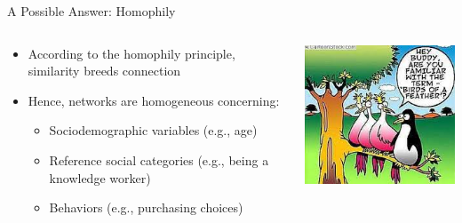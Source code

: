 \documentclass[notes, aspectratio=1610]{beamer}
\begin{document}
\begin{frame}{A Possible Answer: Homophily}{}
	\begin{columns}
		\begin{column}{0.5\textwidth}
		\begin{itemize}
			\item 
			According to the homophily principle, similarity breeds 
			connection
			\pause 
			\item 
			Hence, networks are homogeneous concerning:
			\begin{itemize}
				\item 
				Sociodemographic variables (e.g., age)
			 	\item 
				Reference social categories (e.g., being a knowledge worker)
				\item 
				Behaviors (e.g., purchasing choices)
			\end{itemize}
		\end{itemize}
		\end{column}
		\begin{column}{0.5\textwidth}
			\includegraphics[width=1\textwidth]{images/birds_of_a_feather.jpeg}
		\end{column}
	\end{columns}
\end{frame}
\end{document}
